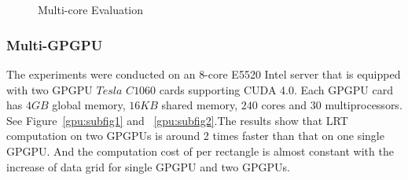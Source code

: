 \documentclass[10pt,journal,cspaper,compsoc]{IEEEtran}
\begin{document}
\begin{figure}[h]
{\label{multicore:norectangles}
}\\
~~
\caption{Multi-core Evaluation}\label{multicore}
\end{figure}

\subsubsection{Multi-GPGPU}
\noindent The experiments were conducted on an 8-core E5520 Intel server that
is equipped with two GPGPU $Tesla$ $C1060$ cards supporting CUDA 4.0.
Each GPGPU card has $4GB$ global memory, $16KB$ shared memory, $240$
cores and $30$ multiprocessors. See Figure~\ref{gpu:subfig1} and ~\ref{gpu:subfig2}.The results show
that LRT computation on two GPGPUs is around 2 times faster than that on one single GPGPU. And the computation
cost of per rectangle is almost constant with the increase
of data grid for single GPGPU and two GPGPUs.
\end{document}
